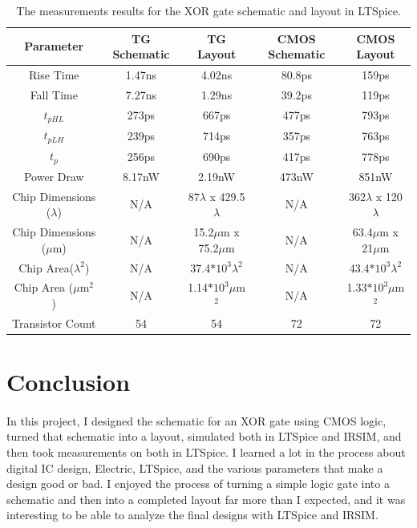 \documentclass{article}
\begin{document}
  \begin{table}[H]
    \centering
    \footnotesize
    \begin{tabular}{|c|c|c|c|c|}
      \hline
      \textbf{Parameter} & \textbf{TG Schematic} & \textbf{TG Layout} & \textbf{CMOS Schematic} & \textbf{CMOS Layout} \\
      \hline
      Rise Time & 1.47ns & 4.02ns & 80.8ps & 159ps \\
      \hline
      Fall Time & 7.27ns & 1.29ns & 39.2ps & 119ps\\
      \hline
      $t_{pHL}$ & 273ps & 667ps & 477ps & 793ps\\
      \hline
      $t_{pLH}$ & 239ps & 714ps & 357ps & 763ps\\
      \hline
      $t_{p}$ & 256ps & 690ps & 417ps & 778ps\\
      \hline
      Power Draw & 8.17nW & 2.19nW & 473nW & 851nW \\
      \hline
      Chip Dimensions ($\lambda$) & N/A & 87$\lambda$ x 429.5$\lambda$ & N/A & 362$\lambda$ x 120$\lambda$ \\
      \hline
      Chip Dimensions ($\mu$m) & N/A & 15.2$\mu$m x 75.2$\mu$m & N/A & 63.4$\mu$m x 21$\mu$m \\
      \hline
      Chip Area($\lambda^2$) & N/A & 37.4$*10^3\lambda^2$ & N/A & 43.4$*10^3\lambda^2$ \\
      \hline
      Chip Area ($\mu$m$^2$) & N/A & 1.14$*10^3\mu$m$^2$ & N/A & 1.33$*10^3\mu$m$^2$ \\
      \hline
      Transistor Count & 54 & 54 & 72 & 72 \\
      \hline
    \end{tabular}
    \caption{The measurements results for the XOR gate schematic and layout in LTSpice.}
    \label{table:meas-lay}
  \end{table}


\section{Conclusion}
  \paragraph{}
  In this project, I designed the schematic for an XOR gate using CMOS logic, turned that schematic into a layout, simulated both in LTSpice and IRSIM, and then took measurements on both in LTSpice. I learned a lot in the process about digital IC design, Electric, LTSpice, and the various parameters that make a design good or bad. I enjoyed the process of turning a simple logic gate into a schematic and then into a completed layout far more than I expected, and it was interesting to be able to analyze the final designs with LTSpice and IRSIM. 
\end{document}
